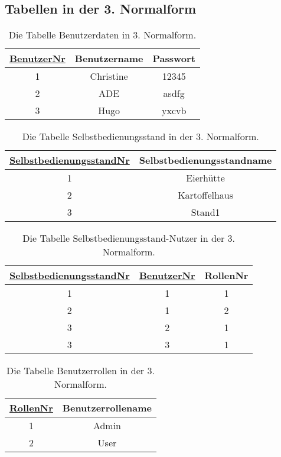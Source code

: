 \subsection *{Tabellen in der 3. Normalform}\label{3NF}


\begin{table}[H]
	\centering
	\begin{tabular}{|c|c|c|}
		\hline
		\underline{BenutzerNr} & Benutzername & Passwort \\
		\hline
		1 & Christine &  12345\\
		\hline
		2 & ADE &  asdfg\\
		\hline
		3 & Hugo &  yxcvb\\
		\hline
	\end{tabular}
	\caption{Die Tabelle Benutzerdaten in 3. Normalform.}
\end{table}

\begin{table}[H]
	\centering
	\begin{tabular}{|c|c|}
		\hline
		\underline{SelbstbedienungsstandNr} & Selbstbedienungsstandname \\
		\hline
		1 & Eierhütte \\
		\hline
		2 & Kartoffelhaus \\
		\hline
		3 & Stand1 \\
		\hline
	\end{tabular}
	\caption{Die Tabelle Selbstbedienungsstand in der 3. Normalform.}
\end{table}

\begin{table}[H]
	\centering
	\begin{tabular}{|c|c|c|}
		\hline
		\underline{SelbstbedienungsstandNr} & \underline{BenutzerNr} & RollenNr \\
		\hline
		1 & 1 &  1\\
		\hline
		2 & 1 &  2\\
		\hline
		3 & 2 &  1\\
		\hline
		3 & 3 &  1\\
		\hline
	\end{tabular}
	\caption{Die Tabelle Selbstbedienungsstand-Nutzer in der 3. Normalform.}
\end{table}

\begin{table}[H]
	\centering
	\begin{tabular}{|c|c|}
		\hline
		\underline{\underline{RollenNr}} & Benutzerrollename \\
		\hline
		1 & Admin  \\
		\hline
		2 & User \\
		\hline
	\end{tabular}
	\caption{Die Tabelle Benutzerrollen in der 3. Normalform.}
\end{table}


